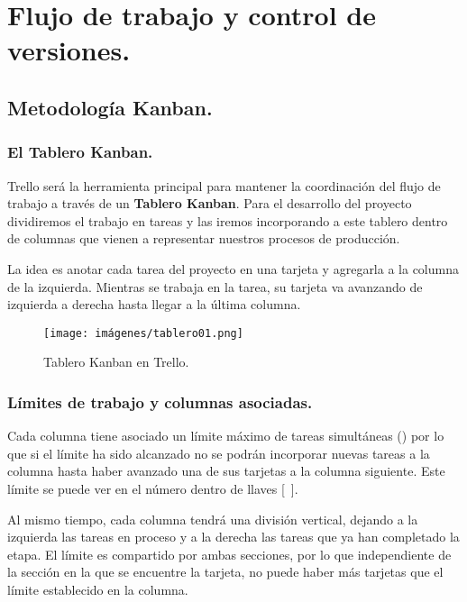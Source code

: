 
\section{Flujo de trabajo y control de versiones.}\label{flujo:flujo-de-trabajo}

\subsection{Metodología Kanban.}\label{flujo:metodologia-kanban}
\subsubsection{El Tablero Kanban.}\label{flujo:tablero-kanban}
Trello será la herramienta principal para mantener la coordinación del flujo de trabajo a través de un \textbf{Tablero Kanban}. Para el desarrollo del proyecto dividiremos el trabajo en tareas y las iremos incorporando a este tablero dentro de columnas que vienen a representar nuestros procesos de producción.

La idea es anotar cada tarea del proyecto en una tarjeta y agregarla a la columna de la izquierda. Mientras se trabaja en la tarea, su tarjeta va avanzando de izquierda a derecha hasta llegar a la última columna.  

\begin{figure}[h]
	\centering
	\texttt{[image: imágenes/tablero01.png]}
	\caption{Tablero Kanban en Trello.}
\end{figure}

\subsubsection{Límites de trabajo y columnas asociadas.}\label{flujo:limites-de-trabajo}
Cada columna tiene asociado un límite máximo de tareas simultáneas () por lo que si el límite ha sido alcanzado no se podrán incorporar nuevas tareas a la columna hasta haber avanzado una de sus tarjetas a la columna siguiente. Este límite se puede ver en el número dentro de llaves [~].

Al mismo tiempo, cada columna tendrá una división vertical, dejando a la izquierda las tareas en proceso y a la derecha las tareas que ya han completado la etapa. El límite es compartido por ambas secciones, por lo que independiente de la sección en la que se encuentre la tarjeta, no puede haber más tarjetas que el límite establecido en la columna.

